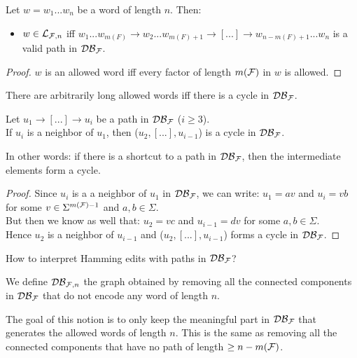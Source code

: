 \documentclass{article}
\begin{document}
\begin{proposition}
	Let $w = w_1...w_n$ be a word of length $n$. Then: 
	\begin{itemize}
		\item[] $w \in \mathcal{L}_{\mathcal{F}, n}$ iff $w_1...w_{m(F)} \rightarrow w_2...w_{m(F) + 1} \rightarrow [...] \rightarrow w_{n - m(F) + 1}...w_n$ is a valid path in $\mathcal{DB}_{\mathcal{F}}$.
	\end{itemize}
\end{proposition}
\begin{proof}
	$w$ is an allowed word iff every factor of length $m(\mathcal{F})$ in $w$ is allowed.
\end{proof}

\begin{remark}
	There are arbitrarily long allowed words iff there is a cycle in $\mathcal{DB}_{\mathcal{F}}$.
\end{remark}

\begin{result}
	Let $u_1 \rightarrow [...] \rightarrow u_i$ be a path in $\mathcal{DB}_{\mathcal{F}}$ ($i \geq 3$). \\
	If $u_i$ is a neighbor of $u_1$, then ($u_2, [...], u_{i-1}$) is a cycle in $\mathcal{DB}_{\mathcal{F}}$.
\end{result}
\noindent
In other words: if there is a shortcut to a path in $\mathcal{DB}_{\mathcal{F}}$, then the intermediate elements form a cycle.
\begin{proof}
	Since $u_i$ is a a neighbor of $u_1$ in $\mathcal{DB}_{\mathcal{F}}$, we can write: $u_1 = av$ and $u_i = vb$ for some $v \in \Sigma^{m(\mathcal{F}) - 1}$ and $a, b \in \Sigma$. \\
	But then we know as well that: $u_2 = vc$ and $u_{i-1} = dv$ for some $a, b \in \Sigma$. \\
	Hence $u_2$ is a neighbor of $u_{i-1}$ and ($u_2, [...], u_{i-1}$) forms a cycle in $\mathcal{DB}_{\mathcal{F}}$.
\end{proof}

\begin{idea*}
	How to interpret Hamming edits with paths in $\mathcal{DB}_{\mathcal{F}}$?
\end{idea*}

\begin{definition}
	We define $\mathcal{DB}_{\mathcal{F}, n}$ the graph obtained by removing all the connected components in $\mathcal{DB}_{\mathcal{F}}$ that do not encode any word of length $n$.
\end{definition}
\noindent
The goal of this notion is to only keep the meaningful part in $\mathcal{DB}_{\mathcal{F}}$ that generates the allowed words of length $n$. This is the same as removing all the connected components that have no path of length $\geq n - m(\mathcal{F})$.
\end{document}
